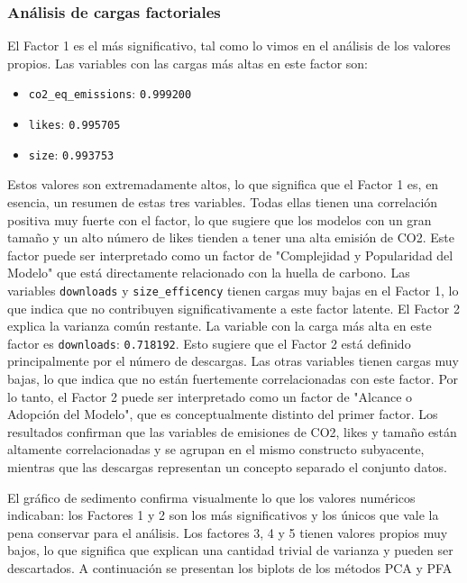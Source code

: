 \documentclass[journal]{IEEEtran}
\begin{document}
	\subsubsection{Análisis de cargas factoriales}
	El Factor 1 es el más significativo, tal como lo vimos en el análisis de los valores propios. Las variables con las cargas más altas en este factor son:
	\begin{itemize}
		\item \texttt{co2\_eq\_emissions}: \texttt{0.999200}
		\item \texttt{likes}: \texttt{0.995705}
		\item \texttt{size}: \texttt{0.993753}
	\end{itemize}
	Estos valores son extremadamente altos, lo que significa que el Factor 1 es, en esencia, un resumen de estas tres variables. Todas ellas tienen una correlación positiva muy fuerte con el factor, lo que sugiere que los modelos con un gran tamaño y un alto número de likes tienden a tener una alta emisión de CO2. Este factor puede ser interpretado como un factor de "Complejidad y Popularidad del Modelo" que está directamente relacionado con la huella de carbono.
	Las variables \texttt{downloads} y \texttt{size\_efficency} tienen cargas muy bajas en el Factor 1, lo que indica que no contribuyen significativamente a este factor latente.
	El Factor 2 explica la varianza común restante. La variable con la carga más alta en este factor es \texttt{downloads}: \texttt{0.718192}. Esto sugiere que el Factor 2 está definido principalmente por el número de descargas. Las otras variables tienen cargas muy bajas, lo que indica que no están fuertemente correlacionadas con este factor. Por lo tanto, el Factor 2 puede ser interpretado como un factor de "Alcance o Adopción del Modelo", que es conceptualmente distinto del primer factor.
	Los resultados confirman que las variables de emisiones de CO2, likes y tamaño están altamente correlacionadas y se agrupan en el mismo constructo subyacente, mientras que las descargas representan un concepto separado el conjunto datos.

	El gráfico de sedimento confirma visualmente lo que los valores numéricos indicaban: los Factores 1 y 2 son los más significativos y los únicos que vale la pena conservar para el análisis. Los factores 3, 4 y 5 tienen valores propios muy bajos, lo que significa que explican una cantidad trivial de varianza y pueden ser descartados.
	A continuación se presentan los biplots de los métodos PCA y PFA
\end{document}
